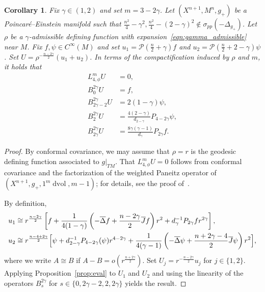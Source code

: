 \documentclass{amsart}
\newtheorem{cor}[thm]{Corollary}
\theoremstyle{definition}
\theoremstyle{remark}
\numberwithin{equation}{section}
\begin{document}
\begin{cor}
 \label{cor:eval}
 Fix $\gamma\in(1,2)$ and set $m=3-2\gamma$.  Let $(X^{n+1},M^n,g_+)$ be a Poincar\'e--Einstein manifold such that $\frac{n^2}{4}-\gamma^2,\frac{n^2}{4}-(2-\gamma)^2\not\in\sigma_{pp}(-\Delta_{g_+})$.  Let $\rho$ be a $\gamma$-admissible defining function with expansion~\eqref{eqn:gamma_admissible} near $M$.  Fix $f,\psi\in C^\infty(M)$ and set $u_1={\mathcal{P}}\left(\frac{n}{2}+\gamma\right)f$ and $u_2={\mathcal{P}}\left(\frac{n}{2}+2-\gamma\right)\psi$.  Set $U=\rho^{-\frac{n-2\gamma}{2}}(u_1+u_2)$.  In terms of the compactification induced by $\rho$ and $m$, it holds that
 \begin{align*}
  L_{4,\phi}^mU & = 0 , \\
  B_{0}^{2\gamma}U & = f, \\
  B_{2\gamma-2}^{2\gamma}U & = 2(1-\gamma)\psi, \\
  B_{2}^{2\gamma}U & = \frac{4(2-\gamma)}{d_{2-\gamma}}P_{4-2\gamma}\psi, \\
  B_{2\gamma}^{2\gamma}U & = \frac{8\gamma(\gamma-1)}{d_\gamma}P_{2\gamma}f .
 \end{align*}
\end{cor}

\begin{proof}
 By conformal covariance, we may assume that $\rho=r$ is the geodesic defining function associated to $g{\rvert}_{TM}$.  That $L_{4,\phi}^mU=0$ follows from conformal covariance and the factorization of the weighted Paneitz operator of $(X^{n+1},g_+,1^m\operatorname{dvol},m-1)$; for details, see the proof of~\cite[Theorem~4.4]{CaseChang2013}.

 By definition,
 \begin{align*}
  u_1 & \cong r^{\frac{n-2\gamma}{2}}\left[f + \frac{1}{4(1-\gamma)}\left(-{\overline{\Delta}} f + \frac{n-2\gamma}{2}{\overline{J}} f\right)r^2 + d_\gamma^{-1}P_{2\gamma}f r^{2\gamma}\right] , \\
  u_2 & \cong r^{\frac{n-4+2\gamma}{2}}\Bigl[ \psi + d_{2-\gamma}^{-1}P_{4-2\gamma}(\psi)r^{4-2\gamma} + \frac{1}{4(\gamma-1)}\left(-{\overline{\Delta}}\psi + \frac{n+2\gamma-4}{2}{\overline{J}}\psi\right)r^2\Bigr] ,
 \end{align*}
 where we write $A\cong B$ if $A-B=o(r^{\frac{n+2\gamma}{2}})$.  Set $U_j=r^{-\frac{n-2\gamma}{2}}u_j$ for $j\in\{1,2\}$.  Applying Proposition~\ref{prop:eval} to $U_1$ and $U_2$ and using the linearity of the operators $B_{s}^{2\gamma}$ for $s\in\{0,2\gamma-2,2,2\gamma\}$ yields the result.
\end{proof}
\end{document}

